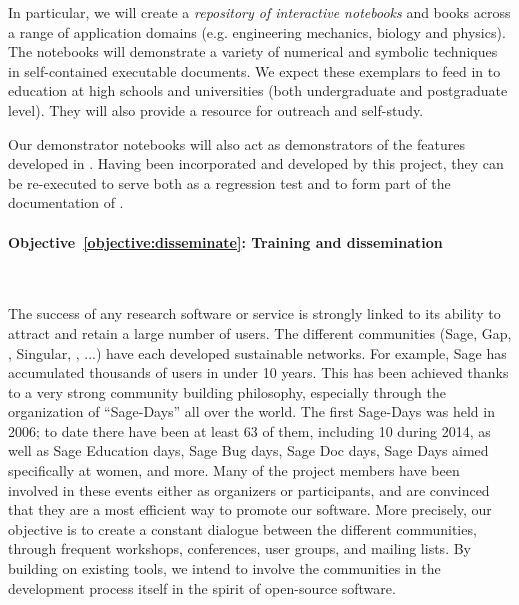 \documentclass[noworkareas,deliverables,\classoptions]{euproposal}       %
\begin{document}
\begin{proposal}
In particular, we will create a \emph{repository of interactive
  notebooks}  and books across a range
of application domains (e.g. engineering mechanics, biology and
physics). The notebooks will demonstrate a variety of numerical and
symbolic techniques in self-contained executable documents. We expect
these exemplars to feed in to education at high schools and
universities (both undergraduate and postgraduate level). They will
also provide a resource for outreach and self-study.

Our demonstrator notebooks will also act as demonstrators of the
features developed in \TheProject. Having been incorporated and
developed by this project, they can be re-executed to serve both as a
regression test and to form part of the documentation of \TheProject.



\paragraph{Objective~\ref{objective:disseminate}: Training and dissemination}\ 

The success of any research software or service is strongly linked to
its ability to attract and retain a large number of users. The
different communities (Sage, Gap, \PariGP, Singular, \Jupyter, ...)
have each developed sustainable networks. For example, Sage has
accumulated thousands of users in under 10 years. This has been
achieved thanks to a very strong community building philosophy,
especially through the organization of ``Sage-Days'' all over the
world. The first Sage-Days was held in 2006; to date there have been
at least 63 of them, including 10 during 2014, as well as Sage
Education days, Sage Bug days, Sage Doc days, Sage Days aimed
specifically at women, and more. Many of the \TheProject{} project
members have been involved in these events either as organizers or
participants, and are convinced that they are a most efficient way to
promote our software. More precisely, our objective is to create a
constant dialogue between the different communities, through frequent
workshops, conferences, user groups, and mailing lists. By building on
existing tools, we intend to involve the communities in the
development process itself in the spirit of open-source software.


\end{proposal}
\end{document}
